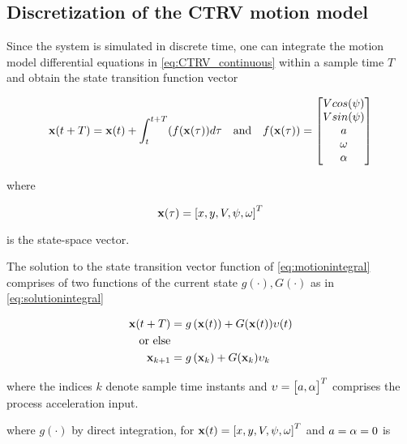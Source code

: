 \subsection{Discretization of the CTRV motion model}

Since the system is simulated in discrete time, one can integrate the motion model differential equations in \cref{eq:CTRV_continuous} within a sample time $T$ and obtain the state transition function vector


\begin{equation}\label{eq:motionintegral}
\begin{aligned}
\mathbf{x}(t+T) = \mathbf{x}(t) + \int_{t}^{t+T}(f(\mathbf{x}(\tau))d\tau &&\text{and}&& f(\mathbf{x(\tau)})=  \begin{bmatrix}{V} cos({\psi}) \\ {V} sin({\psi}) \\ {a} \\ \omega \\ {\alpha}  \end{bmatrix}
\end{aligned}
\end{equation}

where 

\begin{equation}
\mathbf{x(\tau)} = \left[x,y,{V}, {\psi},\omega\right]^{T}
\end{equation}

is the state-space vector. 

The solution to the state transition vector function of \cref{eq:motionintegral} comprises of two functions of the current state $g(\cdot), G(\cdot)$ as in \eqref{eq:solutionintegral}




\begin{align}\label{eq:solutionintegral}
\mathbf{x}(t+T) &= g\left(\mathbf{x}(t)\right)   + G(\mathbf{x}(t)){\upsilon}(t) \\
\textrm{or else} \nonumber\\
\mathbf{x}_{k+1} &= g\left(\mathbf{x}_k\right)   + G(\mathbf{x}_k){\upsilon}_k
\end{align}

where the indices $k$ denote sample time instants and  ${\upsilon} = \left[\begin{matrix}{a}, {\alpha}\end{matrix}\right]^T$ comprises the process acceleration input.

where $g(\cdot)$ by direct integration, for $\mathbf{x}(t) =\left[x,y,{V}, {\psi},\omega\right]^{T} $ and ${a}={\alpha}=0$ is

